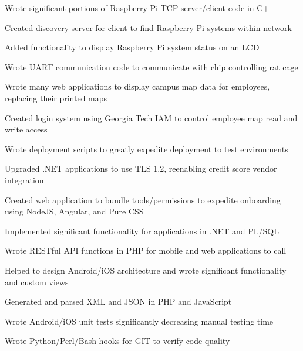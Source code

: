 \documentclass[line]{resume}
\begin{document}
\begin{myitemize}
	\item Wrote significant portions of Raspberry Pi TCP server/client code in C++ 
	\item Created discovery server for client to find Raspberry Pi systems within network 
	\item Added functionality to display Raspberry Pi system status on an LCD 
	\item Wrote UART communication code to communicate with chip controlling rat cage 
\end{myitemize}

\begin{myitemize}
	\item Wrote many web applications to display campus map data for employees, replacing their printed maps
	\item Created login system using Georgia Tech IAM to control employee map read and write access 
\end{myitemize}

\begin{myitemize}
	\item Wrote deployment scripts to greatly expedite deployment to test environments
	\item Upgraded .NET applications to use TLS 1.2, reenabling credit score vendor integration
	\item Created web application to bundle tools/permissions to expedite onboarding using NodeJS, Angular, and Pure CSS
	\item Implemented significant functionality for applications in .NET and PL/SQL 
\end{myitemize}

\begin{myitemize}
	\item Wrote RESTful API functions in PHP for mobile and web applications to call 
	\item Helped to design Android/iOS architecture and wrote significant functionality and custom views
	\item Generated and parsed XML and JSON in PHP and JavaScript 
	\item Wrote Android/iOS unit tests significantly decreasing manual testing time 
	\item Wrote Python/Perl/Bash hooks for GIT to verify code quality
\end{myitemize}
\end{document}
